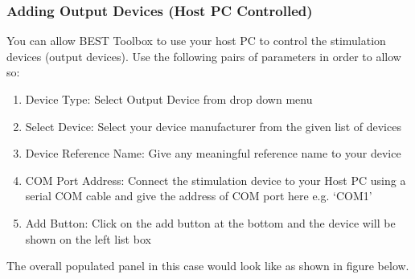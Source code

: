 \documentclass[letterpaper,10pt,english]{sphinxmanual}
\begin{document}
\subsubsection{Adding Output Devices (Host PC Controlled)}
\label{\detokenize{5_HardwareConfiguration:adding-output-devices-host-pc-controlled}}
\sphinxAtStartPar
You can allow BEST Toolbox to use your host PC to control the stimulation devices (output devices). Use the following pairs of parameters in order to allow so:
\begin{enumerate}
%
\item {} 
\sphinxAtStartPar
Device Type: Select Output Device from drop down menu

\item {} 
\sphinxAtStartPar
Select Device: Select your device manufacturer from the given list of devices

\item {} 
\sphinxAtStartPar
Device Reference Name: Give any meaningful reference name to your device

\item {} 
\sphinxAtStartPar
COM Port Address: Connect the stimulation device to your Host PC using a serial COM cable and give the address of COM port here e.g. ‘COM1’

\item {} 
\sphinxAtStartPar
Add Button: Click on the add button at the bottom and the device will be shown on the left list box

\end{enumerate}

\sphinxAtStartPar
The overall populated panel in this case would look like as shown in figure below.
\end{document}
